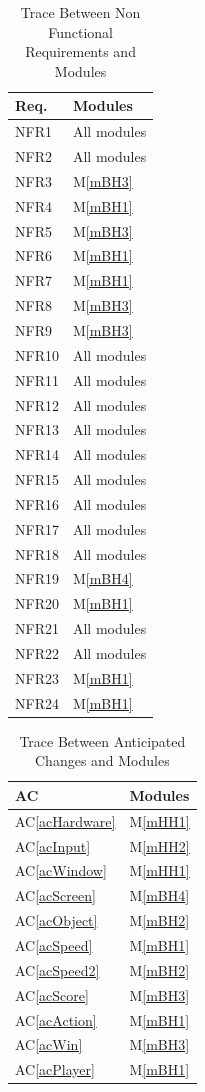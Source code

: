 \documentclass[12pt, titlepage]{article}
\newcommand{\acref}[1]{AC\ref{#1}}
\newcommand{\mref}[1]{M\ref{#1}}
\begin{document}
\begin{table}[H]
\centering
\begin{tabular}{p{} p{}}
\toprule
\textbf{Req.} & \textbf{Modules}\\
\midrule
NFR1 & All modules\\
NFR2 & All modules\\
NFR3 & \mref{mBH3}\\
NFR4 & \mref{mBH1}\\
NFR5 & \mref{mBH3}\\
NFR6 & \mref{mBH1}\\
NFR7 & \mref{mBH1}\\
NFR8 & \mref{mBH3}\\
NFR9 & \mref{mBH3}\\
NFR10 & All modules\\
NFR11 & All modules\\
NFR12 & All modules\\
NFR13 & All modules\\
NFR14 & All modules\\
NFR15 & All modules\\
NFR16 & All modules\\
NFR17 & All modules\\
NFR18 & All modules\\
NFR19 & \mref{mBH4}\\
NFR20 & \mref{mBH1}\\
NFR21 & All modules\\
NFR22 & All modules\\
NFR23 & \mref{mBH1}\\
NFR24 & \mref{mBH1}\\
\bottomrule
\end{tabular}
\caption{Trace Between Non Functional Requirements and Modules}
\label{TblNFRT}
\end{table}

\begin{table}[H]
\centering
\begin{tabular}{p{} p{}}
\toprule
\textbf{AC} & \textbf{Modules}\\
\midrule
\acref{acHardware} & \mref{mHH1}\\
\acref{acInput} & \mref{mHH2}\\
\acref{acWindow} & \mref{mHH1}\\
\acref{acScreen} & \mref{mBH4}\\
\acref{acObject} & \mref{mBH2}\\
\acref{acSpeed} & \mref{mBH1}\\
\acref{acSpeed2} & \mref{mBH2}\\
\acref{acScore} & \mref{mBH3}\\
\acref{acAction} & \mref{mBH1}\\
\acref{acWin} & \mref{mBH3}\\
\acref{acPlayer} & \mref{mBH1}\\
\bottomrule
\end{tabular}
\caption{Trace Between Anticipated Changes and Modules}
\label{TblACT}
\end{table}
\end{document}

